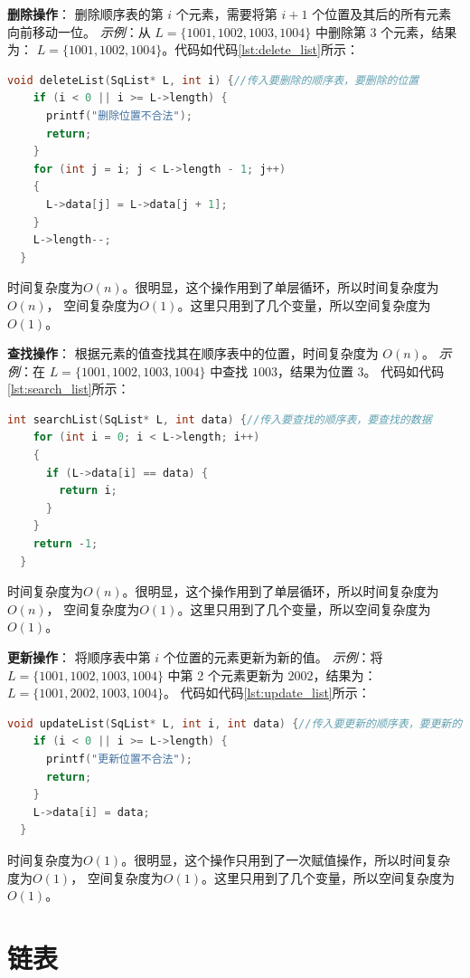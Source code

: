 \documentclass[lang=cn,newtx,10pt,scheme=chinese]{elegantbook}
\begin{document}
\textbf{删除操作}：
删除顺序表的第 $i$ 个元素，需要将第 $i+1$ 个位置及其后的所有元素向前移动一位。
\textit{示例}：从 $L = \{1001, 1002, 1003, 1004\}$ 中删除第 3 个元素，结果为：
$L = \{1001, 1002, 1004\}$。代码如代码\ref{lst:delete_list}所示：
\begin{lstlisting}[language=C++, caption={顺序表的删除示例代码}, label={lst:delete_list}]
  void deleteList(SqList* L, int i) {//传入要删除的顺序表，要删除的位置
    if (i < 0 || i >= L->length) {
      printf("删除位置不合法");
      return;
    }
    for (int j = i; j < L->length - 1; j++)
    {
      L->data[j] = L->data[j + 1];
    }
    L->length--;
  }
  \end{lstlisting}
时间复杂度为$O(n)$。很明显，这个操作用到了单层循环，所以时间复杂度为$O(n)$，
空间复杂度为$O(1)$。这里只用到了几个变量，所以空间复杂度为$O(1)$。

\textbf{查找操作}：
根据元素的值查找其在顺序表中的位置，时间复杂度为 $O(n)$。
\textit{示例}：在 $L = \{1001, 1002, 1003, 1004\}$ 中查找 $1003$，结果为位置 3。
代码如代码\ref{lst:search_list}所示：
\begin{lstlisting}[language=C++, caption={顺序表的查找示例代码}, label={lst:search_list}]
  int searchList(SqList* L, int data) {//传入要查找的顺序表，要查找的数据
    for (int i = 0; i < L->length; i++)
    {
      if (L->data[i] == data) {
        return i;
      }
    }
    return -1;
  }
  \end{lstlisting}
时间复杂度为$O(n)$。很明显，这个操作用到了单层循环，所以时间复杂度为$O(n)$，
空间复杂度为$O(1)$。这里只用到了几个变量，所以空间复杂度为$O(1)$。

\textbf{更新操作}：
将顺序表中第 $i$ 个位置的元素更新为新的值。
\textit{示例}：将 $L = \{1001, 1002, 1003, 1004\}$ 中第 2 个元素更新为 $2002$，结果为：
$L = \{1001, 2002, 1003, 1004\}$。
代码如代码\ref{lst:update_list}所示：
\begin{lstlisting}[language=C++, caption={顺序表的更新示例代码}, label={lst:update_list}]
  void updateList(SqList* L, int i, int data) {//传入要更新的顺序表，要更新的位置，要更新的数据
    if (i < 0 || i >= L->length) {
      printf("更新位置不合法");
      return;
    }
    L->data[i] = data;
  }
  \end{lstlisting}
时间复杂度为$O(1)$。很明显，这个操作只用到了一次赋值操作，所以时间复杂度为$O(1)$，
空间复杂度为$O(1)$。这里只用到了几个变量，所以空间复杂度为$O(1)$。

\section{链表}
\end{document}
